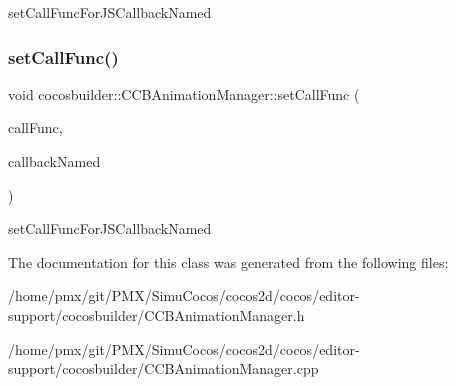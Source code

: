 set\+Call\+Func\+For\+J\+S\+Callback\+Named \mbox{\label{classcocosbuilder_1_1CCBAnimationManager_a98a96e47cd517ea03ed009c4c4d640e4}} 
\subsubsection{\texorpdfstring{set\+Call\+Func()}{setCallFunc()}\hspace{0.1cm}{\footnotesize\ttfamily [2/2]}}
{\footnotesize\ttfamily void cocosbuilder\+::\+C\+C\+B\+Animation\+Manager\+::set\+Call\+Func (\begin{DoxyParamCaption}\item[{cocos2d\+::\+Call\+Func $\ast$}]{call\+Func,  }\item[{const std\+::string \&}]{callback\+Named }\end{DoxyParamCaption})}

set\+Call\+Func\+For\+J\+S\+Callback\+Named 

The documentation for this class was generated from the following files\+:\begin{DoxyCompactItemize}
\item 
/home/pmx/git/\+P\+M\+X/\+Simu\+Cocos/cocos2d/cocos/editor-\/support/cocosbuilder/C\+C\+B\+Animation\+Manager.\+h\item 
/home/pmx/git/\+P\+M\+X/\+Simu\+Cocos/cocos2d/cocos/editor-\/support/cocosbuilder/C\+C\+B\+Animation\+Manager.\+cpp\end{DoxyCompactItemize}
